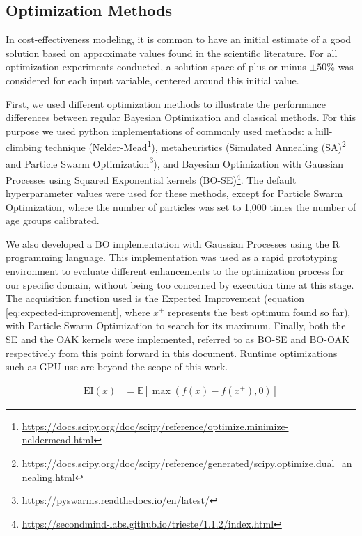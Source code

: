 \documentclass{IOS-Book-Article}
\begin{document}
\subsection{Optimization Methods}
In cost-effectiveness modeling, it is common to have an initial estimate of a good solution based on approximate values found in the scientific literature. For all optimization experiments conducted, a solution space of plus or minus $\pm 50\%$ was considered for each input variable, centered around this initial value.
	
First, we used different optimization methods to illustrate the performance differences between regular Bayesian Optimization and classical methods. For this purpose we used python implementations of commonly used methods: a hill-climbing technique (Nelder-Mead\footnote{\url{https://docs.scipy.org/doc/scipy/reference/optimize.minimize-neldermead.html}}\cite{nelder-mead}), metaheuristics (Simulated Annealing (SA)\footnote{\url{https://docs.scipy.org/doc/scipy/reference/generated/scipy.optimize.dual_annealing.html}}\cite{simulated-annealing} and Particle Swarm Optimization\footnote{\url{https://pyswarms.readthedocs.io/en/latest/}}\cite{pso}), and Bayesian Optimization with Gaussian Processes using Squared Exponential kernels (BO-SE)\footnote{\url{https://secondmind-labs.github.io/trieste/1.1.2/index.html}}. The default hyperparameter values were used for these methods, except for Particle Swarm Optimization, where the number of particles was set to 1,000 times the number of age groups calibrated.

We also developed a BO implementation with Gaussian Processes using the R programming language. This implementation was used as a rapid prototyping environment to evaluate different enhancements to the optimization process for our specific domain, without being too concerned by execution time at this stage. The acquisition function used is the Expected Improvement (equation \ref{eq:expected-improvement}, where $x^+$ represents the best optimum found so far), with Particle Swarm Optimization to search for its maximum. Finally, both the SE and the OAK kernels were implemented, referred to as BO-SE and BO-OAK respectively from this point forward in this document. Runtime optimizations such as GPU use are beyond the scope of this work.
	
	\begin{equation} \label{eq:expected-improvement}
		\begin{aligned}
			\text{EI}(x) &= \mathbb{E}[\max(f(x)-f(x^+), 0)]
		\end{aligned}
	\end{equation}
\end{document}
